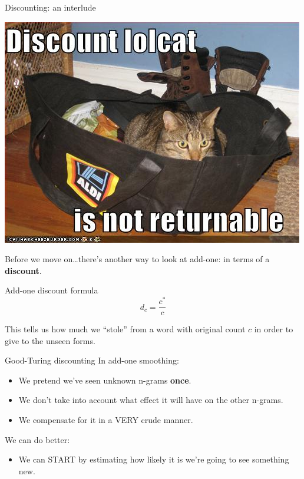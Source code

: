 \documentclass{beamer}
\begin{document}
\begin{frame}{Discounting: an interlude}
  \begin{center}
    \includegraphics[scale=0.2]{images/discount.jpg}
  \end{center}
  
  Before we move on\ldots there's another way to look at add-one: 
  in terms of a \textbf{discount}.
  \begin{block}{Add-one discount formula}
    \[d_c = \frac{c^*}{c}\]
  \end{block}
  This tells us how much we ``stole'' from a word with original count $c$
  in order to give to the unseen forms.
\end{frame}

\begin{frame}{Good-Turing discounting}
  In add-one smoothing:\pause
  \begin{itemize}
  \item We pretend we've seen unknown n-grams \textbf{once}. \pause
  \item We don't take into account what effect it will have on the 
    other n-grams.\pause
  \item We compensate for it in a VERY crude manner.\pause
  \end{itemize}
  We can do better: 
  \begin{itemize}
  \item We can START by estimating how likely it is we're going to see
    something new.
  \end{itemize}
\end{frame}
\end{document}
